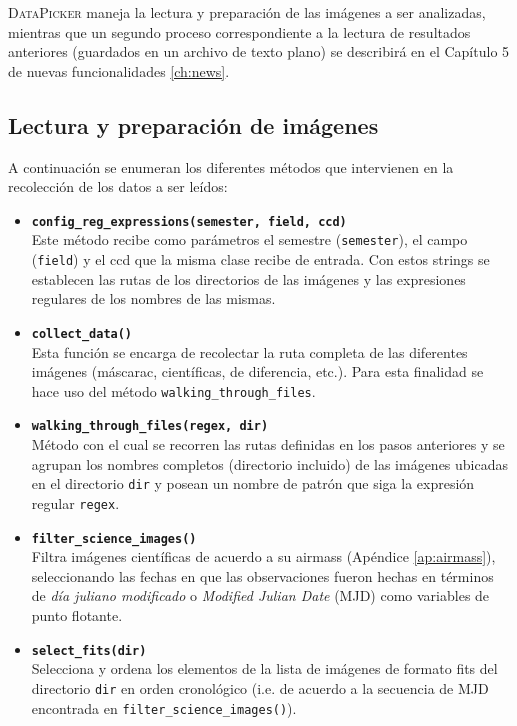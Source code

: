 \textsc{DataPicker} maneja  la lectura y preparaci\'on de las im\'agenes a ser analizadas, mientras que un segundo proceso correspondiente a la lectura de resultados anteriores (guardados en un archivo de texto plano) se describir\'a en el Cap\'itulo 5 de nuevas funcionalidades \ref{ch:news}. 
\bigskip
  
\subsection{Lectura y preparaci\'on de im\'agenes}
A continuaci\'on se enumeran los diferentes m\'etodos que intervienen en la recolecci\'on de los datos a ser le\'idos:

\begin{itemize}
\item \textbf{\texttt{config\_reg\_expressions(semester, field, ccd)}}\\
Este m\'etodo recibe como par\'ametros el semestre (\texttt{semester}), el campo (\texttt{field}) y el ccd que la misma clase recibe de entrada. Con estos strings se establecen las rutas de los directorios de las im\'agenes y las expresiones regulares de los nombres de las mismas.
\bigskip

\item \textbf{\texttt{collect\_data()}}\\
Esta funci\'on se encarga de recolectar la ruta completa de las diferentes im\'agenes (m\'ascarac, cient\'ificas, de diferencia, etc.). Para esta finalidad se hace uso del m\'etodo \texttt{walking\_through\_files}. 
\bigskip

\item \textbf{\texttt{walking\_through\_files(regex, dir)}}\\
M\'etodo con el cual se recorren las rutas definidas en los pasos anteriores y se agrupan los nombres completos (directorio incluido) de las im\'agenes ubicadas en el directorio \texttt{dir} y posean un nombre de patr\'on que siga la expresi\'on regular \texttt{regex}.
\bigskip

\item \textbf{\texttt{filter\_science\_images()}}\\
Filtra im\'agenes cient\'ificas de acuerdo a su airmass (Ap\'endice  \ref{ap:airmass}), seleccionando las fechas en que las observaciones fueron hechas en t\'erminos de \textit{d\'ia juliano modificado} o \textit{Modified Julian Date} (MJD) como variables de punto flotante.
\bigskip

\item \textbf{\texttt{select\_fits(dir)}}\\
Selecciona y ordena los elementos de la lista de im\'agenes de formato fits del directorio \texttt{dir} en orden cronol\'ogico (i.e. de acuerdo a la secuencia de MJD encontrada en \texttt{filter\_science\_images()}).
\bigskip


\end{itemize}
